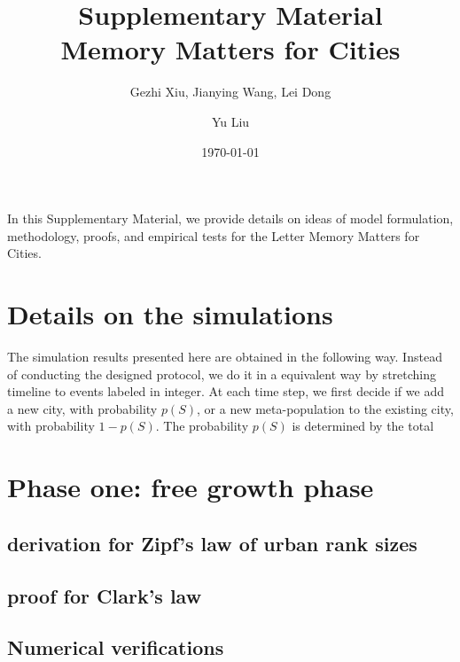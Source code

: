 \documentclass[aps,prl]{revtex4-1}
\begin{document}
\title{Supplementary Material\\Memory Matters for Cities}
\date{\today}
\author{Gezhi Xiu, Jianying Wang, Lei Dong}

\author{Yu Liu}

\pacs{} 



\maketitle
\tableofcontents
In this Supplementary Material, we provide details on ideas of model formulation, methodology, proofs, and empirical tests for the Letter Memory Matters for Cities.
\section{Details on the simulations}

The simulation results presented here are obtained in the following way. Instead of conducting the designed protocol, we do it in a equivalent way by stretching timeline to events labeled in integer. At each time step, we first decide if we add a new city, with probability $p(S)$, or a new meta-population to the existing city, with probability $1-p(S)$. The probability $p(S)$ is determined by the total 

\section{Phase one: free growth phase}

\subsection{derivation for Zipf's law of urban rank sizes}

\subsection{proof for Clark's law}

\subsection{Numerical verifications}
\end{document}

